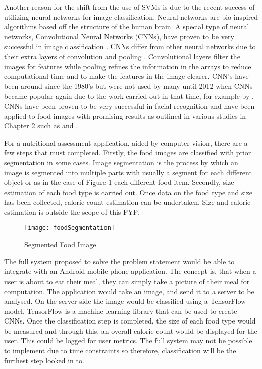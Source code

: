 Another reason for the shift from the use of SVMs is due to the recent success of utilizing neural networks for image classification.
Neural networks are bio-inspired algorithms based off the structure of the human brain.
A special type of neural networks, Convolutional Neural Networks (CNNs), have proven to be very successful in image classification \parencite{krizhevsky2012imagenet}.
CNNs differ from other neural networks due to their extra layers of convolution and pooling \parencite{visualizing}.
Convolutional layers filter the images for features while pooling refines the information in the arrays to reduce computational time and to make the features in the image clearer.
CNN's have been around since the 1980's \parencite{handsOnML} but were not used by many until 2012 when CNNs became popular again due to the work carried out in that time, for example by \parencite{krizhevsky2012imagenet}.
CNNs have been proven to be very successful in facial recognition and have been applied to food images with promising results as outlined in various studies in Chapter 2 such as \parencite{yanaiFood} and \parencite{deepLearning}.

For a nutritional assessment application, aided by computer vision, there are a
few steps that must completed. Firstly, the food images are classified with prior segmentation in some cases.
Image segmentation is the process by which an image is segmented into multiple parts with usually a segment for each different object or as in the case of Figure \ref{fig:foodSegment} each different food item.
Secondly, size estimation of each food type is carried out. Once data on the food type and size has been collected, calorie count estimation can be undertaken. Size and calorie estimation is outside the scope of this FYP.

\begin{figure}[h]
  \centering
  \texttt{[image: foodSegmentation]}
  \caption{Segmented Food Image \parencite{segmentFood}}
  \label{fig:foodSegment}
\end{figure}


The full system proposed to solve the problem statement would be able to integrate with an Android mobile phone application.
The concept is, that when a user is about to eat their meal, they can simply take a picture of their meal for computation.
The application would take an image, and send it to a server to be analysed.
On the server side the image would be classified using a TensorFlow model.
TensorFlow is a machine learning library that can be used to create CNNs.
Once the classification step is completed, the size of each food type would be measured and through this, an overall calorie count would be displayed for the user.
This could be logged for user metrics.
The full system may not be possible to implement due to time constraints so therefore, classification will be the furthest step looked in to.

